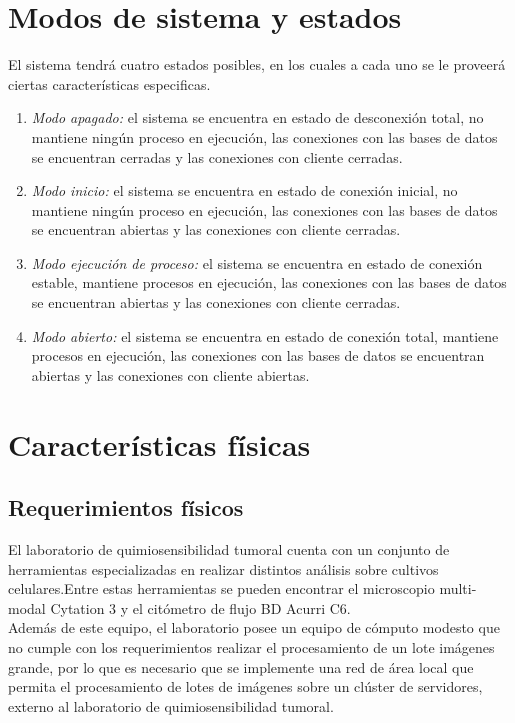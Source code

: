 \documentclass{scrreprt}
\begin{document}
\section{Modos de sistema y estados}
El sistema tendrá cuatro estados posibles, en los cuales a cada uno se le proveerá ciertas características especificas.

\begin{enumerate}[label=\alph*.]
	\item \textit{Modo apagado:} el sistema se encuentra en estado de desconexión total, no mantiene ningún proceso en ejecución, las conexiones con las bases de datos se encuentran cerradas y las conexiones con cliente cerradas.
    \item \textit{Modo inicio:} el sistema se encuentra en estado de conexión inicial, no mantiene ningún proceso en ejecución, las conexiones con las bases de datos se encuentran abiertas y las conexiones con cliente cerradas.
    \item \textit{Modo ejecución de proceso:} el sistema se encuentra en estado de conexión estable, mantiene procesos en ejecución, las conexiones con las bases de datos se encuentran abiertas y las conexiones con cliente cerradas.
    \item \textit{Modo abierto:} el sistema se encuentra en estado de conexión total, mantiene procesos en ejecución, las conexiones con las bases de datos se encuentran abiertas y las conexiones con cliente abiertas.
\end{enumerate}

\section{Características físicas}

\subsection{Requerimientos físicos}

El laboratorio de quimiosensibilidad tumoral cuenta con un conjunto de herramientas especializadas en realizar distintos análisis sobre cultivos celulares.Entre estas herramientas se pueden encontrar el microscopio multi-modal Cytation 3 y el citómetro de flujo BD Acurri C6.\\

Además de este equipo, el laboratorio posee un equipo de cómputo modesto que no cumple con los requerimientos realizar el procesamiento de un lote imágenes grande, por lo que es necesario que se implemente una red de área local que permita el procesamiento de lotes de imágenes sobre un clúster de servidores, externo al laboratorio de quimiosensibilidad tumoral.
 
\end{document}
